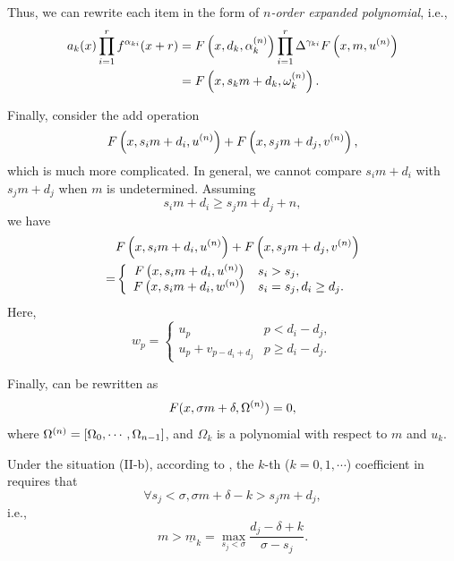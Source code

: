 Thus, we can rewrite each item in the form of \emph{$n$-order expanded polynomial}, i.e.,
\begin{equation}
\begin{split}
a_k(x)\prod_{i=1}^r{f^{\alpha_{ki}}(x+r)}&=F\left(x,d_k,\alpha_k^{(n)}\right)\prod_{i=1}^r{\Delta^{\gamma_{ki}}F\left(x,m,u^{(n)}\right)} \\
&= F\left(x,s_k m+d_k, \omega_k^{(n)}\right) .
\end{split}
\end{equation}

Finally, consider the add operation
\begin{equation}
F\left(x,s_i m+d_i,u^{(n)}\right)+F\left(x,s_j m+d_j,v^{(n)}\right),
\end{equation}
which is much more complicated. In general, we cannot compare $s_i m + d_i$ with $s_j m + d_j$ when $m$ is undetermined. Assuming
\begin{equation}
s_i m+d_i\ge s_j m+d_j+n, \label{cond_add}
\end{equation}
we have
\begin{equation}
\begin{split}
&F\left(x,s_i m+d_i,u^{(n)}\right)+F\left(x,s_j m+d_j,v^{(n)}\right) \\
=&\left\{
\begin{array}{cl}
    F\left(x,s_i m+d_i,u^{(n)}\right) & s_i>s_j ,            \\
    F\left(x,s_i m+d_i,w^{(n)}\right) & s_i=s_j,d_i\ge d_j .
\end{array}
\right.
\end{split}
\end{equation}
Here,
\begin{equation}
w_p=\left\{
\begin{array}{cl}
u_p               & p<d_i-d_j ,   \\
u_p+v_{p-d_i+d_j} & p\ge d_i-d_j.
\end{array}
\right.
\end{equation}

Finally,  can be rewritten as
\begin{equation}
F(x,\sigma m + \delta,\Omega^{(n)})=0,
\label{eq-np}
\end{equation}
where $\Omega^{(n)}=\left[\Omega_0,\cdots,\Omega_{n-1}\right]$, and $\Omega_k$ is a polynomial with respect to $m$ and $u_k$.

Under the situation (II-b), according to , the $k$-th ($k=0,1,\cdots$) coefficient in  requires that
\begin{equation}
\forall s_j<\sigma, \sigma m + \delta - k > s_j m + d_j,
\end{equation}
i.e.,
\begin{equation}
m > \underline{m}_k=\underset{s_j<\sigma}{\max}{\frac{d_j-\delta+k}{\sigma-s_j}}.
\end{equation}


